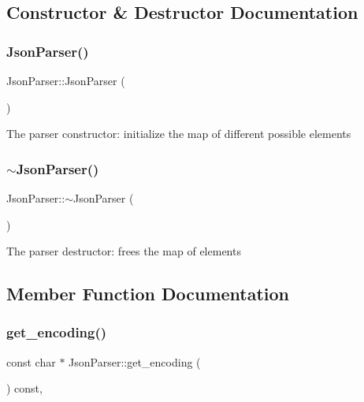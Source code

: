 \subsection{Constructor \& Destructor Documentation}
\mbox{\label{classJsonParser_af21abdfb0ceac731e44d897a0285f5d4}} 
\subsubsection{\texorpdfstring{Json\+Parser()}{JsonParser()}}
{\footnotesize\ttfamily Json\+Parser\+::\+Json\+Parser (\begin{DoxyParamCaption}{ }\end{DoxyParamCaption})}

The parser constructor\+: initialize the map of different possible elements \mbox{\label{classJsonParser_a7c0393b54c37f9ff30b6bb59f0ba92ce}} 
\subsubsection{\texorpdfstring{$\sim$\+Json\+Parser()}{~JsonParser()}}
{\footnotesize\ttfamily Json\+Parser\+::$\sim$\+Json\+Parser (\begin{DoxyParamCaption}{ }\end{DoxyParamCaption})\hspace{0.3cm}{\ttfamily [default]}}

The parser destructor\+: frees the map of elements 

\subsection{Member Function Documentation}
\mbox{\label{classJsonParser_a449d410175c5055eb171f00105305ec5}} 
\subsubsection{\texorpdfstring{get\+\_\+encoding()}{get\_encoding()}}
{\footnotesize\ttfamily const char $\ast$ Json\+Parser\+::get\+\_\+encoding (\begin{DoxyParamCaption}{ }\end{DoxyParamCaption}) const\hspace{0.3cm}{\ttfamily [override]}, {\ttfamily [virtual]}}

